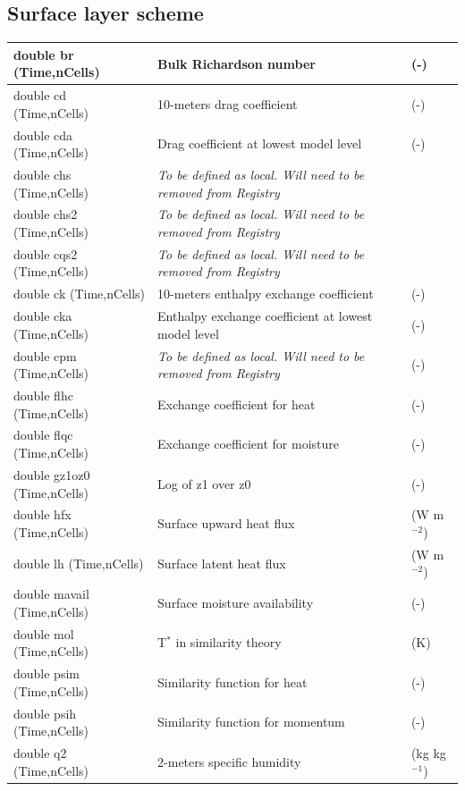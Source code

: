 \documentclass[11pt]{report}
\begin{document}
\subsection{Surface layer scheme}

{\small
\begin{longtable}{|p{2.0in} |p{3.0in} |p{1.0in} |}
\hline
double br (Time,nCells) & Bulk Richardson number & (-) \\ \hline
double cd (Time,nCells) & 10-meters drag coefficient & (-) \\ \hline
double cda (Time,nCells) & Drag coefficient at lowest model level & (-) \\ \hline
double chs (Time,nCells) & \em{To be defined as local. Will need to be removed from Registry} & \\ \hline
double chs2 (Time,nCells) & \em{To be defined as local. Will need to be removed from Registry} & \\ \hline
double cqs2 (Time,nCells) & \em{To be defined as local. Will need to be removed from Registry} & \\ \hline
double ck (Time,nCells) & 10-meters enthalpy exchange coefficient & (-) \\ \hline
double cka (Time,nCells) &  Enthalpy exchange coefficient at lowest model level & (-) \\ \hline
double cpm (Time,nCells) & \em{To be defined as local. Will need to be removed from Registry} & (-) \\ \hline
double flhc (Time,nCells) & Exchange coefficient for heat & (-) \\ \hline
double flqc (Time,nCells) & Exchange coefficient for moisture & (-) \\ \hline
double gz1oz0 (Time,nCells) & Log of z1 over z0 & (-) \\ \hline
double hfx (Time,nCells) & Surface upward heat flux & (W m$^{-2}$) \\ \hline
double lh (Time,nCells) & Surface latent heat flux & (W m$^{-2}$) \\ \hline
double mavail (Time,nCells) & Surface moisture availability & (-) \\ \hline
double mol (Time,nCells) &  T$^{*}$ in similarity theory & (K) \\ \hline
double psim (Time,nCells) & Similarity function for heat & (-) \\ \hline
double psih (Time,nCells) & Similarity function for momentum & (-) \\ \hline
double q2 (Time,nCells) & 2-meters specific humidity & (kg kg$^{-1}$) \\ \hline

\end{longtable}}
\end{document}
